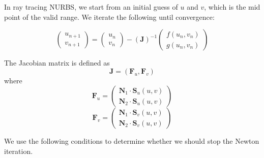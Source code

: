 \documentclass[acmtog]{acmart}
\begin{document}
In ray tracing NURBS, we start from an initial guess of $u$ and $v$, which is the mid point of the valid range. We iterate the following until convergence: 

\[
	\left(\begin{matrix}
		u_{n+1} \\ v_{n+1}
	\end{matrix}\right)	
	= 
	\left(\begin{matrix}
		u_n \\ v_n
	\end{matrix}\right) - 
	\left(\mathbf{J}\right)^{-1}
	\left(\begin{matrix}
		f(u_n, v_n) \\ g(u_n, v_n)
	\end{matrix}\right)
\]

The Jacobian matrix is defined as \[
	\mathbf{J} = (\mathbf{F}_u, \mathbf{F}_v)	
\] where \[
	\mathbf{F}_u = \left(\begin{matrix}
		\mathbf{N}_1 \cdot \mathbf{S}_u(u, v)\\
		\mathbf{N}_2 \cdot \mathbf{S}_u(u, v)
	\end{matrix}\right)	
\]\[
	\mathbf{F}_v = \left(\begin{matrix}
		\mathbf{N}_1 \cdot \mathbf{S}_v(u, v)\\
		\mathbf{N}_2 \cdot \mathbf{S}_v(u, v)
	\end{matrix}\right)	
\]

We use the following conditions to determine whether we should stop the Newton iteration. 
\end{document}
